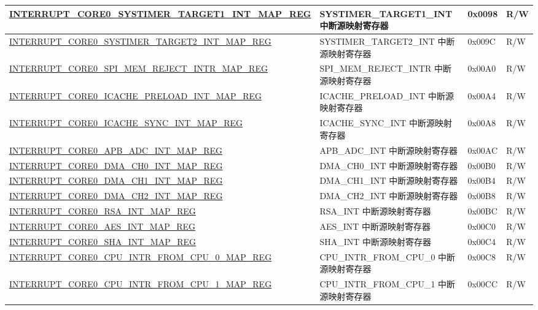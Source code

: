 \begin{longtable}{ | p{10cm} | m{10cm} | m{1.3cm} | m{1.0cm} | }
\hyperref[regdesc:INTERRUPTCORE0SYSTIMERTARGET1INTMAPREG]{INTERRUPT\_CORE0\_SYSTIMER\_TARGET1\_INT\_MAP\_REG} & SYSTIMER\_TARGET1\_INT 中断源映射寄存器 & 0x0098 & R/W \\ \hline
\hyperref[regdesc:INTERRUPTCORE0SYSTIMERTARGET2INTMAPREG]{INTERRUPT\_CORE0\_SYSTIMER\_TARGET2\_INT\_MAP\_REG} & SYSTIMER\_TARGET2\_INT 中断源映射寄存器 & 0x009C & R/W \\ \hline
\hyperref[regdesc:INTERRUPTCORE0SPIMEMREJECTINTRMAPREG]{INTERRUPT\_CORE0\_SPI\_MEM\_REJECT\_INTR\_MAP\_REG} & SPI\_MEM\_REJECT\_INTR 中断源映射寄存器 & 0x00A0 & R/W \\ \hline
\hyperref[regdesc:INTERRUPTCORE0ICACHEPRELOADINTMAPREG]{INTERRUPT\_CORE0\_ICACHE\_PRELOAD\_INT\_MAP\_REG} & ICACHE\_PRELOAD\_INT 中断源映射寄存器 & 0x00A4 & R/W \\ \hline
\hyperref[regdesc:INTERRUPTCORE0ICACHESYNCINTMAPREG]{INTERRUPT\_CORE0\_ICACHE\_SYNC\_INT\_MAP\_REG} & ICACHE\_SYNC\_INT 中断源映射寄存器 & 0x00A8 & R/W \\ \hline
\hyperref[regdesc:INTERRUPTCORE0APBADCINTMAPREG]{INTERRUPT\_CORE0\_APB\_ADC\_INT\_MAP\_REG} & APB\_ADC\_INT 中断源映射寄存器 & 0x00AC & R/W \\ \hline
\hyperref[regdesc:INTERRUPTCORE0DMACH0INTMAPREG]{INTERRUPT\_CORE0\_DMA\_CH0\_INT\_MAP\_REG} & DMA\_CH0\_INT 中断源映射寄存器 & 0x00B0 & R/W \\ \hline
\hyperref[regdesc:INTERRUPTCORE0DMACH1INTMAPREG]{INTERRUPT\_CORE0\_DMA\_CH1\_INT\_MAP\_REG} & DMA\_CH1\_INT 中断源映射寄存器 & 0x00B4 & R/W \\ \hline
\hyperref[regdesc:INTERRUPTCORE0DMACH2INTMAPREG]{INTERRUPT\_CORE0\_DMA\_CH2\_INT\_MAP\_REG} & DMA\_CH2\_INT 中断源映射寄存器 & 0x00B8 & R/W \\ \hline
\hyperref[regdesc:INTERRUPTCORE0RSAINTMAPREG]{INTERRUPT\_CORE0\_RSA\_INT\_MAP\_REG} & RSA\_INT 中断源映射寄存器 & 0x00BC & R/W \\ \hline
\hyperref[regdesc:INTERRUPTCORE0AESINTMAPREG]{INTERRUPT\_CORE0\_AES\_INT\_MAP\_REG} & AES\_INT 中断源映射寄存器 & 0x00C0 & R/W \\ \hline
\hyperref[regdesc:INTERRUPTCORE0SHAINTMAPREG]{INTERRUPT\_CORE0\_SHA\_INT\_MAP\_REG} & SHA\_INT 中断源映射寄存器 & 0x00C4 & R/W \\ \hline
\hyperref[regdesc:INTERRUPTCORE0CPUINTRFROMCPU0MAPREG]{INTERRUPT\_CORE0\_CPU\_INTR\_FROM\_CPU\_0\_MAP\_REG} & CPU\_INTR\_FROM\_CPU\_0 中断源映射寄存器 & 0x00C8 & R/W \\ \hline
\hyperref[regdesc:INTERRUPTCORE0CPUINTRFROMCPU1MAPREG]{INTERRUPT\_CORE0\_CPU\_INTR\_FROM\_CPU\_1\_MAP\_REG} & CPU\_INTR\_FROM\_CPU\_1 中断源映射寄存器 & 0x00CC & R/W \\ \hline

\end{longtable}
